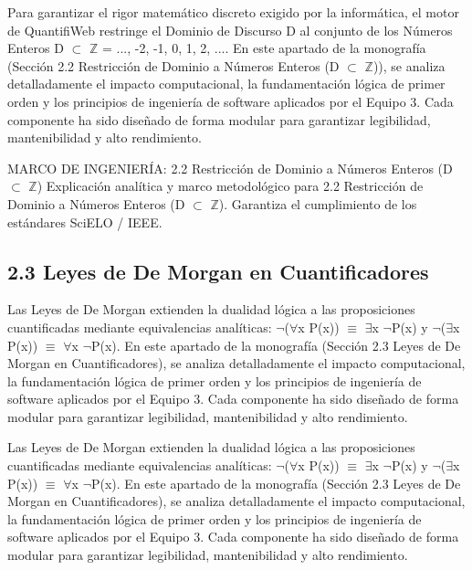 \documentclass[11pt,a4paper]{article}
\begin{document}
Para garantizar el rigor matemático discreto exigido por la informática,
el motor de QuantifiWeb restringe el Dominio de Discurso D al conjunto
de los Números Enteros D $ \subset $ $\mathbb{Z}$ = {..., -2, -1, 0, 1, 2, ...}. En este
apartado de la monografía (Sección 2.2 Restricción de Dominio a Números
Enteros (D $ \subset $ $\mathbb{Z}$)), se analiza detalladamente el impacto computacional, la
fundamentación lógica de primer orden y los principios de ingeniería de
software aplicados por el Equipo 3. Cada componente ha sido diseñado de
forma modular para garantizar legibilidad, mantenibilidad y alto
rendimiento.

\medskip\hrulefill\medskip
 MARCO DE INGENIERÍA: 2.2 Restricción de Dominio a Números Enteros (D
$ \subset $ $\mathbb{Z}$)
Explicación analítica y marco metodológico para 2.2 Restricción de
Dominio a Números Enteros (D $ \subset $ $\mathbb{Z}$). Garantiza el cumplimiento de los
estándares SciELO / IEEE.
\medskip\hrulefill\medskip

\medskip\hrulefill\medskip

\subsection{2.3 Leyes de De Morgan en Cuantificadores}

Las Leyes de De Morgan extienden la dualidad lógica a las proposiciones
cuantificadas mediante equivalencias analíticas: $ \lnot $($ \forall $x P(x)) $ \equiv $ $ \exists $x $ \lnot $P(x) y
$ \lnot $($ \exists $x P(x)) $ \equiv $ $ \forall $x $ \lnot $P(x). En este apartado de la monografía (Sección 2.3
Leyes de De Morgan en Cuantificadores), se analiza detalladamente el
impacto computacional, la fundamentación lógica de primer orden y los
principios de ingeniería de software aplicados por el Equipo 3. Cada
componente ha sido diseñado de forma modular para garantizar
legibilidad, mantenibilidad y alto rendimiento.

Las Leyes de De Morgan extienden la dualidad lógica a las proposiciones
cuantificadas mediante equivalencias analíticas: $ \lnot $($ \forall $x P(x)) $ \equiv $ $ \exists $x $ \lnot $P(x) y
$ \lnot $($ \exists $x P(x)) $ \equiv $ $ \forall $x $ \lnot $P(x). En este apartado de la monografía (Sección 2.3
Leyes de De Morgan en Cuantificadores), se analiza detalladamente el
impacto computacional, la fundamentación lógica de primer orden y los
principios de ingeniería de software aplicados por el Equipo 3. Cada
componente ha sido diseñado de forma modular para garantizar
legibilidad, mantenibilidad y alto rendimiento.
\end{document}
